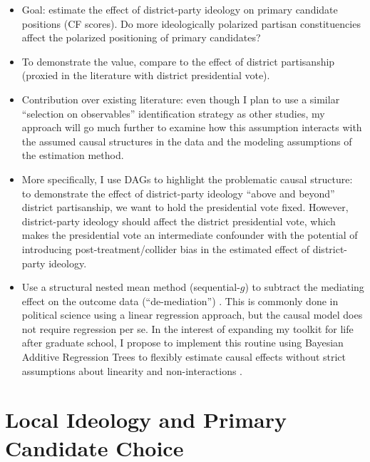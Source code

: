 \documentclass[12pt
              ]{article}
\begin{document}
\begin{itemize}
  \item Goal: estimate the effect of district-party ideology on primary candidate positions (CF scores).
  Do more ideologically polarized partisan constituencies affect the polarized positioning of primary candidates?
  \item To demonstrate the value, compare to the effect of district partisanship (proxied in the literature with district presidential vote).
  \item Contribution over existing literature: even though I plan to use a similar ``selection on observables'' identification strategy as other studies, my approach will go much further to examine how this assumption interacts with the assumed causal structures in the data and the modeling assumptions of the estimation method.
  \item More specifically, I use DAGs to highlight the problematic causal structure: to demonstrate the effect of district-party ideology ``above and beyond'' district partisanship, we want to hold the presidential vote fixed.
  However, district-party ideology should affect the district presidential vote, which makes the presidential vote an intermediate confounder with the potential of introducing post-treatment/collider bias in the estimated effect of district-party ideology.
  
  \item Use a structural nested mean method (sequential-$g$) to subtract the mediating effect on the outcome data (``de-mediation'') \parencite{acharya2016explaining}.
  This is commonly done in political science using a linear regression approach, but the causal model does not require regression per se.
  In the interest of expanding my toolkit for life after graduate school, I propose to implement this routine using Bayesian Additive Regression Trees to flexibly estimate causal effects without strict assumptions about linearity and non-interactions \parencite{hill:2011:bart, green-kern:2012:bart, hahn-et-al:2020:causal-bart}.
  
\end{itemize}

\section{Local Ideology and Primary Candidate Choice}
\end{document}
